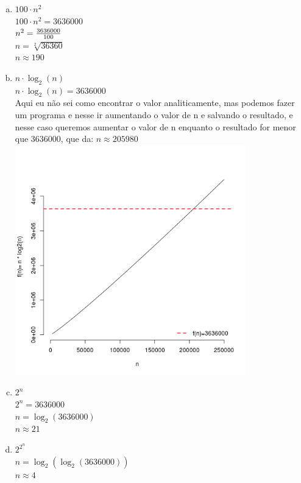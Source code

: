 \documentclass[a4paper,10pt]{article}
\begin{document}
\begin{enumerate}
\begin{enumerate}[(a)]
\item $100\cdot n^2$\\
$100\cdot n^2=3636000$\\
$n^2={3636000\over{100}}$\\
$n=\sqrt[2]{36360}$\\
$n\approx{190}$\\


\item $n\cdot \log_2(n)$\\
$n\cdot \log_2(n)=3636000$\\
Aqui eu não sei como encontrar o valor analiticamente, mas podemos fazer um programa e nesse ir aumentando o valor de 
n e salvando o resultado, e nesse caso queremos aumentar o valor de n enquanto o resultado for menor que 3636000,
que da:
$n\approx{205980}$\\
\includegraphics[width=10cm]{exe2}\\

\item $2^n$\\
$2^n=3636000$\\
$n=\log_2{(3636000)}$\\
$n\approx{21}$\\

\pagebreak

\item $2^{2^n}$\\
$n=\log_2{(\log_2{(3636000)})}$\\
$n\approx{4}$

  \end{enumerate}


\end{enumerate}
\end{document}
